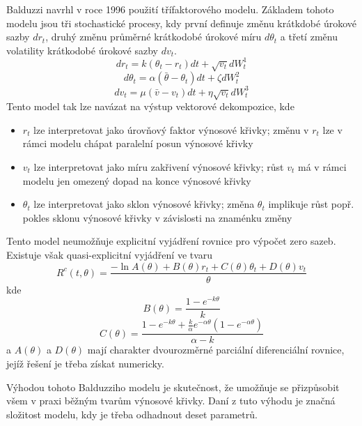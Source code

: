 \documentclass[a4paper]{book}
\begin{document}
Balduzzi navrhl v roce 1996 použití třífaktorového modelu. Základem tohoto modelu jsou tři stochastické procesy, kdy první definuje změnu krátkdobé úrokové sazby $dr_t$, druhý změnu průměrné krátkodobé úrokové míru $d\theta_t$ a třetí změnu volatility krátkodobé úrokové sazby $dv_t$.
\begin{equation*}
dr_t = k(\theta_t - r_t)dt + \sqrt{v_t}dW^1_t
\end{equation*}
\begin{equation*}
d\theta_t = \alpha(\bar{\theta} - \theta_t)dt + \zeta dW^2_t
\end{equation*}
\begin{equation*}
dv_t = \mu(\bar{v} - v_t)dt + \eta \sqrt{v_t}dW^3_t
\end{equation*}
Tento model tak lze navázat na výstup vektorové dekompozice, kde
\begin{itemize}
\item $r_t$ lze interpretovat jako úrovňový faktor výnosové křivky; změnu v $r_t$ lze v rámci modelu chápat paralelní posun výnosové křivky
\item $v_t$ lze interpretovat jako míru zakřivení výnosové křivky; růst $v_t$ má v rámci modelu jen omezený dopad na konce výnosové křivky
\item $\theta_t$ lze interpretovat jako sklon výnosové křivky; změna $\theta_t$ implikuje růst popř. pokles sklonu výnosové křivky v závislosti na znaménku změny
\end{itemize}
Tento model neumožňuje explicitní vyjádření rovnice pro výpočet zero sazeb. Existuje však quasi-explicitní vyjádření ve tvaru
\begin{equation*}
R^c(t, \theta) = \frac{-\ln A(\theta) + B(\theta)r_t + C(\theta)\theta_t + D(\theta)v_t}{\theta}
\end{equation*}
kde
\begin{equation*}
B(\theta) = \frac{1 - e^{-k \theta}}{k}
\end{equation*}
\begin{equation*}
C(\theta) = \frac{1 - e^{-k \theta} + \frac{k}{\alpha}e^{-\alpha \theta}(1 - e^{-\alpha \theta})}{\alpha - k}
\end{equation*}
a $A(\theta)$ a $D(\theta)$ mají charakter dvourozměrné parciální diferenciální rovnice, jejíž řešení je třeba získat numericky.

Výhodou tohoto Balduzziho modelu je skutečnost, že umožňuje se přizpůsobit všem v praxi běžným tvarům výnosové křivky. Daní z tuto výhodu je značná složitost modelu, kdy je třeba odhadnout deset parametrů.
\end{document}
